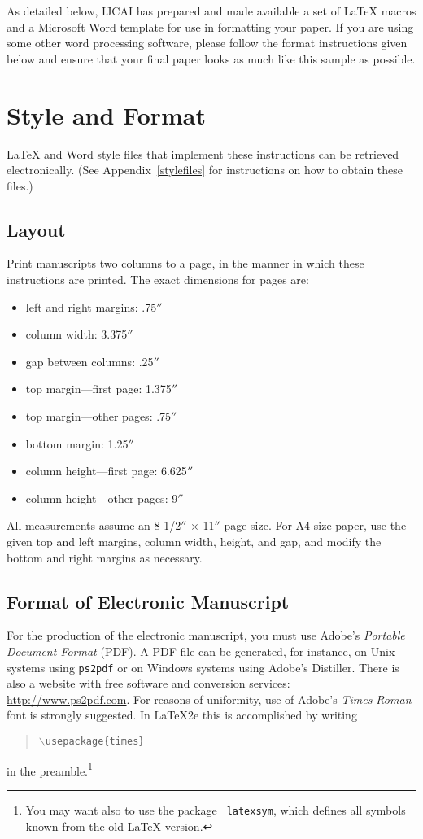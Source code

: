 \documentclass{article}
\begin{document}
As detailed below, IJCAI has prepared and made available a set of
\LaTeX{} macros and a Microsoft Word template for use in formatting
your paper. If you are using some other word processing software, please follow the format instructions given below and ensure that your final paper looks as much like this sample as possible.

\section{Style and Format}

\LaTeX{} and Word style files that implement these instructions
can be retrieved electronically. (See Appendix~\ref{stylefiles} for
instructions on how to obtain these files.)

\subsection{Layout}

Print manuscripts two columns to a page, in the manner in which these
instructions are printed. The exact dimensions for pages are:
\begin{itemize}
\item left and right margins: .75$''$
\item column width: 3.375$''$
\item gap between columns: .25$''$
\item top margin---first page: 1.375$''$
\item top margin---other pages: .75$''$
\item bottom margin: 1.25$''$
\item column height---first page: 6.625$''$
\item column height---other pages: 9$''$
\end{itemize}

All measurements assume an 8-1/2$''$ $\times$ 11$''$ page size. For
A4-size paper, use the given top and left margins, column width,
height, and gap, and modify the bottom and right margins as necessary.

\subsection{Format of Electronic Manuscript}

For the production of the electronic manuscript, you must use Adobe's
{\em Portable Document Format} (PDF). A PDF file can be generated, for
instance, on Unix systems using {\tt ps2pdf} or on Windows systems
using Adobe's Distiller. There is also a website with free software
and conversion services: \url{http://www.ps2pdf.com}. For reasons of
uniformity, use of Adobe's {\em Times Roman} font is strongly suggested.
In \LaTeX2e{} this is accomplished by writing
\begin{quote}
\mbox{\tt $\backslash$usepackage\{times\}}
\end{quote}
in the preamble.\footnote{You may want also to use the package {\tt
latexsym}, which defines all symbols known from the old \LaTeX{}
version.}
\end{document}
